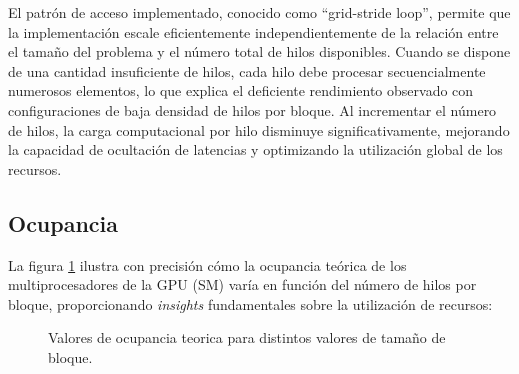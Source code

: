         El patrón de acceso implementado, conocido como ``grid-stride loop'', permite que la implementación escale eficientemente independientemente de la relación entre el tamaño del problema y el número total de hilos disponibles. Cuando se dispone de una cantidad insuficiente de hilos, cada hilo debe procesar secuencialmente numerosos elementos, lo que explica el deficiente rendimiento observado con configuraciones de baja densidad de hilos por bloque. Al incrementar el número de hilos, la carga computacional por hilo disminuye significativamente, mejorando la capacidad de ocultación de latencias y optimizando la utilización global de los recursos.
        
    \subsection{Ocupancia}

        La figura \ref{fig:daxpy_occupancy_per_threadsPerBlock} ilustra con precisión cómo la ocupancia teórica de los multiprocesadores de la GPU (SM) varía en función del número de hilos por bloque, proporcionando \textit{insights} fundamentales sobre la utilización de recursos:

        \begin{figure}[H]
            \centering
            \caption{Valores de ocupancia teorica para distintos valores de tamaño de bloque.}
            \label{fig:daxpy_occupancy_per_threadsPerBlock}
        \end{figure}  
        
